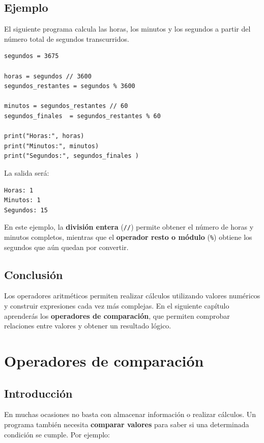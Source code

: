 \documentclass[11pt,a5paper,twoside]{book}
\begin{document}
\subsection{Ejemplo}
El siguiente programa calcula las horas, los minutos y los segundos a partir del número total de segundos transcurridos.

\newpage


\begin{tcolorbox}
\scriptsize
 \begin{verbatim}
segundos = 3675

horas = segundos // 3600
segundos_restantes = segundos % 3600

minutos = segundos_restantes // 60
segundos_finales  = segundos_restantes % 60

print("Horas:", horas)
print("Minutos:", minutos)
print("Segundos:", segundos_finales )
\end{verbatim}
\end{tcolorbox}
La salida será:


\begin{tcolorbox}
\scriptsize
 \begin{verbatim}
Horas: 1
Minutos: 1
Segundos: 15
\end{verbatim}
\end{tcolorbox}
En este ejemplo, la \textbf{división entera} ({\scriptsize \texttt{//}}) permite obtener el número de horas y minutos completos, mientras que el \textbf{operador resto o módulo} ({\scriptsize \texttt{\%}}) obtiene los segundos que aún quedan por convertir.
\subsection{Conclusión}
Los operadores aritméticos permiten realizar cálculos utilizando valores numéricos y construir expresiones cada vez más complejas.
En el siguiente capítulo aprenderás los \textbf{operadores de comparación}, que permiten comprobar relaciones entre valores y obtener un resultado lógico.

\newpage

\section{Operadores de comparación}
\subsection{Introducción}
En muchas ocasiones no basta con almacenar información o realizar cálculos. Un programa también necesita \textbf{comparar valores} para saber si una determinada condición se cumple.
Por ejemplo:
\end{document}
